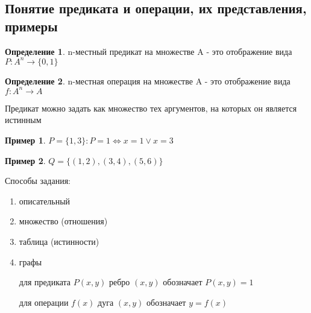 \documentclass[a4paper]{article}
\theoremstyle{definition}
\newtheorem*{example}{Пример}
\newtheorem*{definition}{Определение}
\theoremstyle{remark}
\begin{document}
    \subsection{Понятие предиката и операции, их представления, примеры}
    \begin{definition}
        n-местный предикат на множестве A - это отображение вида $P: A^n \rightarrow \{0, 1\}$ 
    \end{definition}
    \begin{definition}
        n-местная операция на множестве A - это отображение вида $f: A^n \rightarrow A$ 
    \end{definition}
    Предикат можно задать как множество тех аргументов, на которых он является истинным
    \begin{example}
        $P = \{1, 3\} : P = 1 \Leftrightarrow x = 1 \vee x = 3$
    \end{example}
    \begin{example}
        $Q = \{(1, 2), (3, 4), (5, 6)\}$
    \end{example}
    Способы задания:
    \begin{enumerate}
        \item описательный
        \item множество (отношения)
        \item таблица (истинности)
        \item графы 
        
        для предиката $P(x, y)$ ребро $(x, y)$ обозначает $P(x,y) = 1$

        для операции $f(x)$ дуга $(x, y)$ обозначает $y = f(x)$
    \end{enumerate}
\end{document}
